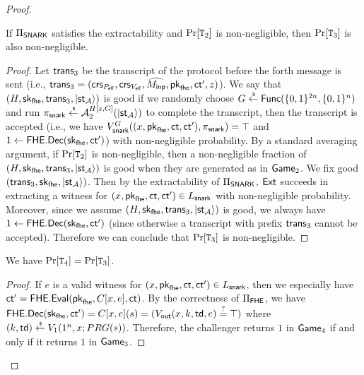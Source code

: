 \begin{proof}
\begin{lemma}\label{lem:eff_gamehop_two}
If $\Pi_{\mathsf{SNARK}}$ satisfies the extractability and $\Pr[\mathtt{T}_2]$ is non-negligible, then $\Pr[\mathtt{T}_3]$ is also non-negligible.
\end{lemma}
\begin{proof}
Let $\mathsf{trans}_3$ be the transcript of the protocol before the forth message is sent (i.e., $\mathsf{trans}_3=(\mathsf{crs}_{P_{\mathsf{eff}}},\mathsf{crs}_{V_{\mathsf{eff}}},\widehat{M_{\mathsf{inp}}},\mathsf{pk}_{\mathsf{fhe}},\mathsf{ct}',z)$).
We say that $(H,\mathsf{sk}_{\mathsf{fhe}},\mathsf{trans}_3,\ket{\mathsf{st}_{\mathcal{A}}})$ is good if we randomly choose $G\overset{\hspace{0.1em}\mathsf{\scriptscriptstyle\$}}{\leftarrow} \mathsf{Func}(\{0,1\}^{2n},\{0,1\}^{n})$ and run $\pi_{\mathsf{snark}}\overset{\hspace{0.1em}\mathsf{\scriptscriptstyle\$}}{\leftarrow} \mathcal{A}_2^{H[z,G]}(\ket{\mathsf{st}_{\mathcal{A}}})$ to complete the transcript, then the transcript is accepted (i.e., we have $V_{\mathsf{snark}}^{G}((x,\mathsf{pk}_{\mathsf{fhe}},\mathsf{ct},\mathsf{ct}'),\pi_{\mathsf{snark}})=\top$ and $1 \leftarrow \mathsf{FHE}.\mathsf{Dec}(\mathsf{sk}_{\mathsf{fhe}},\mathsf{ct}')$) with non-negligible probability.
By a standard averaging argument, if $\Pr[\mathtt{T}_2]$ is non-negligible, then a non-negligible fraction of $(H,\mathsf{sk}_{\mathsf{fhe}},\mathsf{trans}_3,\ket{\mathsf{st}_{\mathcal{A}}})$ is good when they are generated as in $\mathsf{Game}_2$.
We fix good $(\mathsf{trans}_3,\mathsf{sk}_{\mathsf{fhe}},\ket{\mathsf{st}_{\mathcal{A}}})$.
Then by the extractability of $\Pi_{\mathsf{SNARK}}$, $\mathsf{Ext}$ succeeds in extracting a witness for $(x,\mathsf{pk}_{\mathsf{fhe}},\mathsf{ct},\mathsf{ct}')\in L_{\mathsf{snark}}$ with non-negligible probability. Moreover, since we assume $(H,\mathsf{sk}_{\mathsf{fhe}},\mathsf{trans}_3,\ket{\mathsf{st}_{\mathcal{A}}})$ is good, we always have $1 \leftarrow \mathsf{FHE}.\mathsf{Dec}(\mathsf{sk}_{\mathsf{fhe}},\mathsf{ct}')$ (since otherwise a transcript with prefix $\mathsf{trans}_3$ cannot be accepted).
Therefore we can conclude that $\Pr[\mathtt{T}_3]$ is non-negligible.
\end{proof}


\begin{lemma}\label{lem:eff_gamehop_four}
We have $\Pr[\mathtt{T}_4]=\Pr[\mathtt{T}_3]$.
\end{lemma}
\begin{proof}
If $e$ is a valid witness for $(x,\mathsf{pk}_{\mathsf{fhe}}, \mathsf{ct},\mathsf{ct}')\in L_{\mathsf{snark}}$, then we especially have $\mathsf{ct}'= \mathsf{FHE}.\mathsf{Eval}(\mathsf{pk}_{\mathsf{fhe}},\allowbreak C[x,e],\mathsf{ct})$.
By the correctness of $\Pi_{\mathsf{FHE}}$, we have $\mathsf{FHE}.\mathsf{Dec}(\mathsf{sk}_{\mathsf{fhe}},\mathsf{ct}')=C[x,e](s)=(V_{\mathsf{out}}(x,k,\mathsf{td},e)\overset{?}{=}\top)$ where $(k,\mathsf{td})\overset{\hspace{0.1em}\mathsf{\scriptscriptstyle\$}}{\leftarrow} V_1(1^n,x;PRG(s))$.
Therefore, the challenger returns $1$ in $\mathsf{Game}_4$ if and only if it returns $1$ in $\mathsf{Game}_3$.
\end{proof}


\end{proof}
